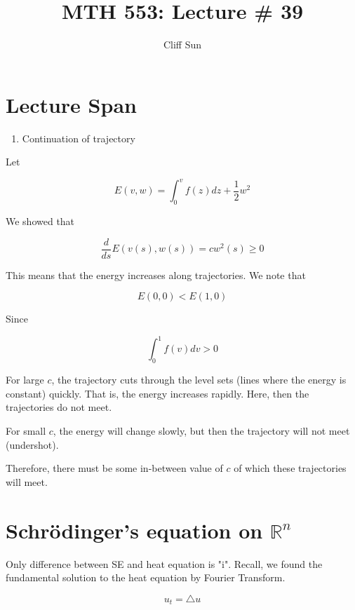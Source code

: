 \documentclass{article}
\title{MTH 553: Lecture \# 39}
\author{Cliff Sun}
\newtheorem{one minute paper}[theorem]{One Minute Paper}
\begin{document}
\maketitle

\section*{Lecture Span}
\begin{enumerate}
    \item Continuation of trajectory
\end{enumerate}

Let 

\begin{equation}
    E(v,w) = \int_{0}^{v}f(z)dz + \frac{1}{2}w^2
\end{equation}

We showed that 

\begin{equation}
    \frac{d}{ds}E(v(s), w(s)) = cw^2(s) \geq 0
\end{equation}

This means that the energy increases along trajectories. We note that 

\begin{equation}
    E(0,0) < E(1,0)
\end{equation}

Since 

\begin{equation}
    \int_{0}^{1}f(v)dv > 0
\end{equation}

For large $c$, the trajectory cuts through the level sets (lines where the energy is constant) quickly. That is, the energy increases rapidly. Here, then the trajectories do not meet. 

For small $c$, the energy will change slowly, but then the trajectory will not meet (undershot). 

Therefore, there must be some in-between value of $c$ of which these trajectories will meet. 

\section*{Schr\"odinger's equation on $\mathbb{R}^n$}

Only difference between SE and heat equation is "i". Recall, we found the fundamental solution to the heat equation by Fourier Transform. 

\begin{equation}
    u_t = \triangle u
\end{equation}
\end{document}
